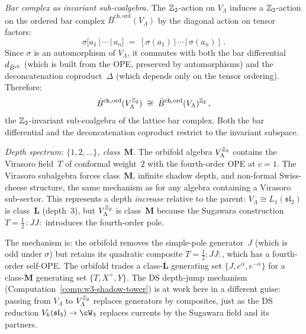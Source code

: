 \begin{computation}
\smallskip
\noindent
\emph{Bar complex as invariant sub-coalgebra.}
The $\mathbb{Z}_2$-action on $V_\Lambda$ induces a $\mathbb{Z}_2$-action on
the ordered bar complex $\bar{B}^{\mathrm{ch,ord}}(V_\Lambda)$
by the diagonal action on tensor factors:
\begin{equation}\label{eq:z2-bar-action}
\sigma\bigl[a_1 \,|\, \cdots \,|\, a_n\bigr]
\;=\;
[\sigma(a_1) \,|\, \cdots \,|\, \sigma(a_n)]\,.
\end{equation}
Since $\sigma$ is an automorphism of $V_\Lambda$, it
commutes with both the bar differential $d_{\bar{B}^{\mathrm{ch}}}$
(which is built from the OPE, preserved by automorphisms)
and the deconcatenation coproduct~$\Delta$ (which depends
only on the tensor ordering). Therefore:
\begin{equation}\label{eq:z2-orbifold-bar}
\bar{B}^{\mathrm{ch,ord}}(V_\Lambda^{\mathbb{Z}_2})
\;\cong\;
\bar{B}^{\mathrm{ch,ord}}(V_\Lambda)^{\mathbb{Z}_2}\,,
\end{equation}
the $\mathbb{Z}_2$-invariant sub-coalgebra of the lattice bar complex.
Both the bar differential and the deconcatenation coproduct restrict to
the invariant subspace.

\smallskip
\noindent
\emph{Depth spectrum: $\{1, 2, \ldots\}$, class~$\mathbf{M}$.}
The orbifold algebra $V_\Lambda^{\mathbb{Z}_2}$ contains the
Virasoro field~$T$ of conformal weight~$2$ with the
fourth-order OPE at $c = 1$. The Virasoro subalgebra
forces class~$\mathbf{M}$, infinite shadow depth, and
non-formal Swiss-cheese structure, the same mechanism
as for any algebra containing a Virasoro sub-sector.
This represents a depth \emph{increase} relative to the
parent: $V_\Lambda \cong L_1(\mathfrak{sl}_2)$ is
class~$\mathbf{L}$ (depth~$3$), but $V_\Lambda^{\mathbb{Z}_2}$
is class~$\mathbf{M}$ because the Sugawara construction
$T = \tfrac{1}{2}\,{:}JJ{:}$ introduces the fourth-order
pole.

The mechanism is: the orbifold removes the
simple-pole generator~$J$ (which is odd under $\sigma$)
but retains its quadratic composite $T = \tfrac{1}{2}{:}JJ{:}$,
which has a fourth-order self-OPE. The orbifold
trades a class-$\mathbf{L}$ generating set
$\{J, e^\alpha, e^{-\alpha}\}$ for a class-$\mathbf{M}$
generating set $\{T, X^+, Y\}$. The DS
depth-jump mechanism
(Computation~\ref{comp:w3-shadow-tower})
is at work here in a different guise: passing from
$V_\Lambda$ to $V_\Lambda^{\mathbb{Z}_2}$ replaces generators
by composites, just as the DS reduction
$V_k(\mathfrak{sl}_3) \to \cW_3$ replaces currents
by the Sugawara field and its partners.


\end{computation}
